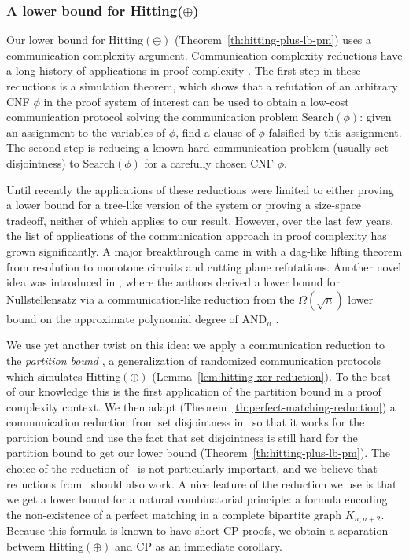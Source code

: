 \documentclass[11pt]{article}
\newcommand{\scterm}[1]{{\textrm{\sc #1}}}
\newcommand{\hit}{\scterm{Hitting}}
\newcommand{\cp}{\scterm{CP}}
\newcommand{\hitp}{{\hit}$(\oplus)$}
\newcommand{\Search}{\mathrm{Search}}
\numberwithin{equation}{section}
\begin{document}
\subsubsection{A lower bound for {\hit}(\texorpdfstring{$\oplus$}{⊕})}

Our lower bound for {\hitp} (Theorem~\ref{th:hitting-plus-lb-pm}) uses a communication complexity argument. Communication complexity reductions have a long history of applications in proof complexity \cite{BPS05,HN12,GP18,IS20,dRNV16}. The first step in these reductions is a simulation theorem, which shows that a refutation of an arbitrary CNF $\phi$ in the proof system of interest can be used to obtain a low-cost communication protocol solving the communication problem $\Search(\phi)$: given an assignment to the variables of $\phi$, find a clause of $\phi$ falsified by this assignment. The second step is reducing a known hard communication problem (usually set disjointness) to $\Search(\phi)$ for a carefully chosen CNF $\phi$.

Until recently the applications of these reductions were limited to either proving a lower bound for a tree-like version of the system or proving a size-space tradeoff, neither of which applies to our result. However, over the last few years, the list of applications of the communication approach in proof complexity has grown significantly. A major breakthrough came in \cite{Sok17,GGKS20} with a dag-like lifting theorem from resolution to monotone circuits and cutting plane refutations. Another novel idea was introduced in \cite{GHJMPRT22}, where the authors derived a lower bound for Nullstellensatz via a communication-like reduction from the $\Omega(\sqrt{n})$ lower bound on the approximate polynomial degree of $\mathrm{AND}_n$ \cite{NS95}.

We use yet another twist on this idea: we apply a communication reduction to the \emph{partition bound} \cite{JK10}, a generalization of randomized communication protocols which simulates {\hitp} (Lemma~\ref{lem:hitting-xor-reduction}). To the best of our knowledge this is the first application of the partition bound in a proof complexity context.
We then adapt (Theorem~\ref{th:perfect-matching-reduction}) a communication reduction from set disjointness in~\cite{IR21} so that it works for the partition bound and use the fact that set disjointness is still hard for the partition bound to get our lower bound (Theorem~\ref{th:hitting-plus-lb-pm}). The choice of the reduction of~\cite{IR21} is not particularly important, and we believe that reductions from~\cite{BPS05,GP18,IS20} should also work. A nice feature of the reduction we use is that we get a lower bound for a natural combinatorial principle: a formula encoding the non-existence of a perfect matching in a complete bipartite graph $K_{n,n+2}$. Because this formula is known to have short {\cp} proofs, we obtain a separation between {\hitp} and {\cp} as an immediate corollary.
\end{document}
